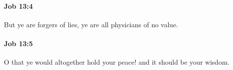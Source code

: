 		\paragraph{Job 13:4} %
			\label{JOB-13-4}

			But ye are forgers of lies, ye are all physicians of no value.


		\paragraph{Job 13:5} %
			\label{JOB-13-5}

			O that ye would altogether hold your peace! and it should be your wisdom.


